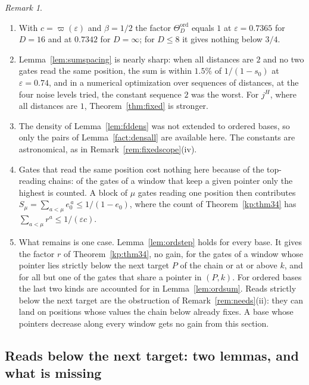 \documentclass[11pt]{amsart}
\theoremstyle{definition}
\theoremstyle{remark}
\newtheorem{remark}[theorem]{Remark}
\newcommand{\eps}{\varepsilon}
\begin{document}
\begin{remark}\label{rem:ordscope}
\begin{enumerate}[label=(\roman*),leftmargin=2.4em]
\item With $c=\varpi(\eps)$ and $\beta=1/2$ the factor $\Theta^{\mathrm{ord}}_D$ equals $1$ at
$\eps=0.7365$ for $D=16$ and at $0.7342$ for $D=\infty$; for $D\le8$ it gives nothing below $3/4$.
\item Lemma~\ref{lem:sumspacing} is nearly sharp: when all distances are $2$ and no two gates
read the same position, the sum is within $1.5\%$ of $1/(1-s_0)$ at $\eps=0.74$, and in a
numerical optimization over sequences of distances, at the four noise levels tried, the constant
sequence $2$ was the worst. For $j^H$, where all distances are $1$, Theorem~\ref{thm:fixed} is
stronger.
\item The density of Lemma~\ref{lem:fddens} was not extended to ordered bases, so only the
pairs of Lemma~\ref{fact:densall} are available here. The constants are astronomical, as in
Remark~\ref{rem:fixedscope}(iv).
\item Gates that read the same position cost nothing here because of the top-reading chains:
of the gates of a window that keep a given pointer only the highest is counted. A block of $\mu$
gates reading one position then contributes $S_\mu=\sum_{a<\mu}e_0^{\,a}\le1/(1-e_0)$, where the
count of Theorem~\ref{kp:thm34} has $\sum_{a<\mu}r^a\le1/(\eps c)$.
\item What remains is one case. Lemma~\ref{lem:ordstep} holds for every base. It gives the
factor $r$ of Theorem~\ref{kp:thm34}, no gain, for the gates of a window whose pointer lies strictly below the next
target $P$ of the chain or at or above $k$, and for all but one of the gates that share a pointer
in $(P,k)$. For ordered bases the last two kinds are accounted for in Lemma~\ref{lem:ordsum}.
Reads strictly below the next target are the obstruction of
Remark~\ref{rem:needs}(ii): they can land on positions whose values the chain below already
fixes. A base whose pointers decrease along every window gets no gain from this section.
\end{enumerate}
\end{remark}

\subsection{Reads below the next target: two lemmas, and what is missing}\label{sec:below}
\end{document}
